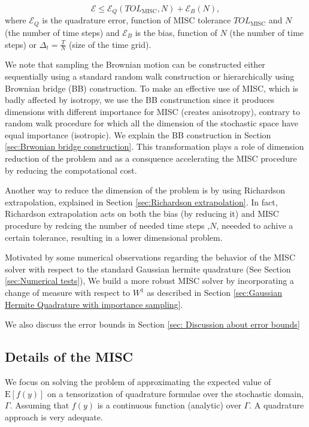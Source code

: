 \documentclass[11pt]{article}
\newcommand{\expt}[1]{\mathrm{E}\left[#1\right]}
\begin{document}
\begin{equation}\label{eq:total_error}
\mathcal{E} \le \mathcal{E}_Q(TOL_{\text{MISC}},N) + \mathcal{E}_B(N),
\end{equation}
where  $\mathcal{E}_Q$ is the quadrature error, function of MISC tolerance $TOL_{\text{MISC}}$ and $N$ (the number of time steps)  and  $\mathcal{E}_B$  is the bias, function of $N$ (the number of time steps) or $\Delta_t=\frac{T}{N}$ (size of the time grid).




We note that sampling the Brownian motion can be constructed either sequentially using a standard random walk construction or hierarchically using Brownian bridge (BB) construction. To make an effective use of MISC, which is badly affected by isotropy, we use the BB construnction since it produces  dimensions with different importance for MISC (creates anisotropy), contrary to random walk procedure for which all the dimension of the stochastic space have equal importance (isotropic). We explain the BB construction in Section \ref{sec:Brwonian bridge construction}. This transformation plays a role of dimension reduction of the problem and as a consquence accelerating the MISC procedure by reducing the compotational cost.



Another way to reduce the dimension of the problem is by using Richardson extrapolation, explained in Section \ref{sec:Richardson extrapolation}. In fact, Richardson extrapolation acts on both the bias (by reducing it) and MISC procedure by redcing the number of needed time steps ,$N$, neeeded to achive a certain tolerance, resulting in a lower dimensional problem.


Motivated by some numerical observations regarding the behavior of the MISC solver with respect to the standard Gaussian hermite quadrature (See Section \ref{sec:Numerical tests}), We build a more robust MISC solver by incorporating a change of measure with respect to $W^1$ as described in Section \ref{sec:Gaussian Hermite Quadrature with importance sampling}.
 
We also discuss the  error bounds in Section \ref{sec: Discussion about error bounds}

\subsection{Details of the MISC}\label{sec:Details of the MISC}

We focus on solving the problem of  approximating the expected value of $\expt{f(y)}$ on a tensorization of quadrature formulae over the stochastic domain, $\Gamma$. Assuming that $f(y)$ is a continuous function (analytic) over $\Gamma$. A quadrature approach is very adequate.
\end{document}

